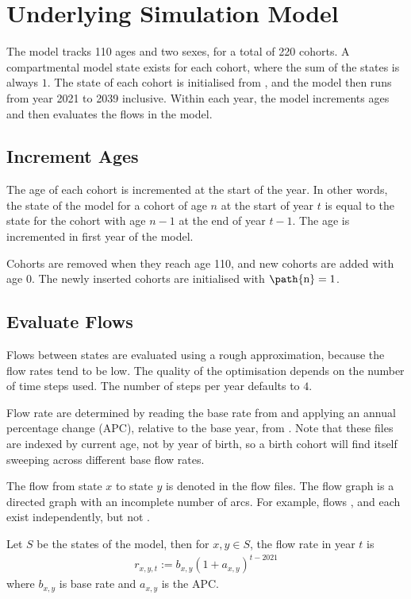 \documentclass[]{article}
\begin{document}
	\section{Underlying Simulation Model}
	
	The model tracks 110 ages and two sexes, for a total of 220 cohorts. A compartmental model state exists for each cohort, where the sum of the states is always $1$. The state of each cohort is initialised from , and the model then runs from year 2021 to 2039 inclusive. Within each year, the model increments ages and then evaluates the flows in the model.
	
	\subsection{Increment Ages}
	The age of each cohort is incremented at the start of the year. In other words, the state of the model for a cohort of age $n$ at the start of year $t$ is equal to the state for the cohort with age $n-1$ at the end of year $t-1$. The age is incremented in first year of the model.
	
	Cohorts are removed when they reach age 110, and new cohorts are added with age 0. The newly inserted cohorts are initialised with $\text{\path{n}} = 1$.
	
	\subsection{Evaluate Flows}
	
	Flows between states are evaluated using a rough approximation, because the flow rates tend to be low. The quality of the optimisation depends on the number of time steps used. The number of steps per year defaults to $4$.
	
	Flow rate are determined by reading the base rate from  and applying an annual percentage change (APC), relative to the base year, from . Note that these files are indexed by current age, not by year of birth, so a birth cohort will find itself sweeping across different base flow rates.
	
	The flow from state $x$ to state $y$ is denoted  in the flow files. The flow graph is a directed graph with an incomplete number of arcs. For example, flows ,  and  each exist independently, but not . 
	
	Let $S$ be the states of the model, then for $x,y \in S$, the flow rate in year $t$ is
	\begin{align*}
		r_{x, y, t} := b_{x,y} (1 + a_{x,y})^{t - 2021}
	\end{align*}
	where $b_{x, y}$ is base rate and $a_{x,y}$ is the APC.
	
\end{document}
